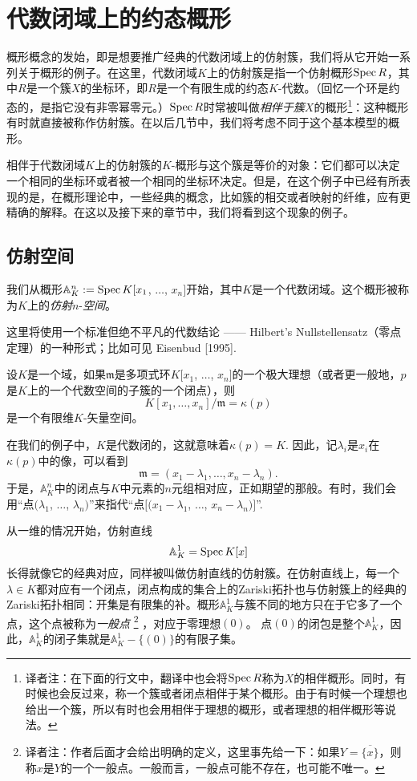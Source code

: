 \section{代数闭域上的约态概形}

概形概念的发始，即是想要推广经典的代数闭域上的仿射簇，我们将从它开始一系列关于概形的例子。在这里，代数闭域$K$上的仿射簇是指一个仿射概形$\operatorname{Spec} R$，其中$R$是一个簇$X$的坐标环，即$R$是一个有限生成的约态$K$\hyp 代数。（回忆一个环是约态的，是指它没有非零幂零元。）$\operatorname{Spec} R$时常被叫做\textit{相伴于簇}$X$的概形\footnote{译者注：在下面的行文中，翻译中也会将$\operatorname{Spec} R$称为$X$的相伴概形。同时，有时候也会反过来，称一个簇或者闭点相伴于某个概形。由于有时候一个理想也给出一个簇，所以有时也会用相伴于理想的概形，或者理想的相伴概形等说法。}：这种概形有时就直接被称作仿射簇。在以后几节中，我们将考虑不同于这个基本模型的概形。

相伴于代数闭域$K$上的仿射簇的$K$\hyp 概形与这个簇是等价的对象：它们都可以决定一个相同的坐标环或者被一个相同的坐标环决定。但是，在这个例子中已经有所表现的是，在概形理论中，一些经典的概念，比如簇的相交或者映射的纤维，应有更精确的解释。在这以及接下来的章节中，我们将看到这个现象的例子。

\subsection{仿射空间}

我们从概形$\mathbb{A}^n_K:=\operatorname{Spec} K[x_1$, $\dots$, $x_n]$开始，其中$K$是一个代数闭域。这个概形被称为$K$上的\textit{仿射}$n$-\textit{空间}。

这里将使用一个标准但绝不平凡的代数结论 ------ Hilbert's Nullstellensatz（零点定理）的一种形式；比如可见 Eisenbud [1995].

\begin{thm}[Nullstellensatz]
	设$K$是一个域，如果$\mathfrak{m}$是多项式环$K[x_1$, $\dots$, $x_n]$的一个极大理想（或者更一般地，$p$是$K$上的一个代数空间的子簇的一个闭点），则
	\[
		K[x_1, \dots, x_n]/\mathfrak{m}=\kappa(p)
	\]
	是一个有限维$K$\hyp 矢量空间。
\end{thm}

在我们的例子中，$K$是代数闭的，这就意味着$\kappa(p)=K$. 因此，记$\lambda_i$是$x_i$在$\kappa(p)$中的像，可以看到
\[
	\mathfrak{m}=(x_1-\lambda_1, \dots, x_n-\lambda_n).
\]
于是，$\mathbb{A}^n_K$中的闭点与$K$中元素的$n$元组相对应，正如期望的那般。有时，我们会用“点$(\lambda_1$, $\dots$, $\lambda_n)$”来指代“点$[(x_1-\lambda_1$, $\dots$, $x_n-\lambda_n)]$”. 

从一维的情况开始，仿射直线
\[
	\mathbb{A}^1_K=\operatorname{Spec} K[x]
\]
长得就像它的经典对应，同样被叫做仿射直线的仿射簇。在仿射直线上，每一个$\lambda\in K$都对应有一个闭点，闭点构成的集合上的Zariski拓扑也与仿射簇上的经典的Zariski拓扑相同：开集是有限集的补。概形$\mathbb{A}^1_K$与簇不同的地方只在于它多了一个点，这个点被称为\textit{一般点}%
\footnote{译者注：作者后面才会给出明确的定义，这里事先给一下：如果$Y=\overline{\{x\}}$，则称$x$是$Y$的一个一般点。一般而言，一般点可能不存在，也可能不唯一。}%
，对应于零理想$(0)$。
\vspace{-1ex}\vspace{-2ex}
点$(0)$的闭包是整个$\mathbb{A}^1_K$，因此，$\mathbb{A}^1_K$的闭子集就是$\mathbb{A}^1_K-\{(0)\}$的有限子集。

